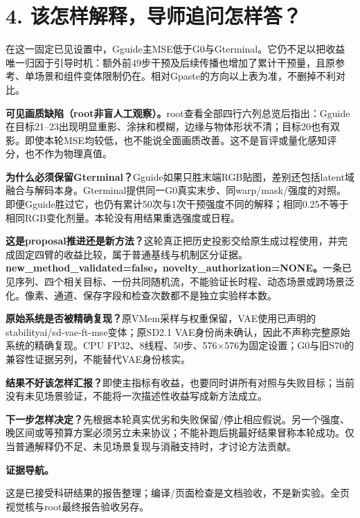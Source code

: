 \documentclass[UTF8,10pt,a4paper]{ctexart}
\begin{document}
\clearpage
\section*{4. 该怎样解释，导师追问怎样答？}
在这一固定已见设置中，Gguide主MSE低于G0与Gterminal。它仍不足以把收益唯一归因于引导时机：额外前49步干预及后续传播也增加了累计干预量，且原参考、单场景和组件变体限制仍在。相对Gpaste的方向以上表为准，不删掉不利对比。

\textbf{可见画质缺陷（root非盲人工观察）。}root查看全部四行六列总览后指出：Gguide在目标21--23出现明显重影、涂抹和模糊，边缘与物体形状不清；目标20也有双影。即使本轮MSE均较低，也不能说全面画质改善。这不是盲评或量化感知评分，也不作为物理真值。

\textbf{为什么必须保留Gterminal？}Gguide如果只胜末端RGB贴图，差别还包括latent域融合与解码本身。Gterminal提供同一G0真实末步、同warp/mask/强度的对照。即便Gguide胜过它，也仍有累计50次与1次干预强度不同的解释；相同0.25不等于相同RGB变化剂量。本轮没有用结果重选强度或日程。

\textbf{这是proposal推进还是新方法？}这轮真正把历史投影交给原生成过程使用，并完成固定四臂的收益比较，属于普通基线与机制区分证据。\textbf{new\_method\_validated=false，novelty\_authorization=NONE。}一条已见序列、四个相关目标、一份共同随机流，不能验证长时程、动态场景或跨场景泛化。像素、通道、保存字段和检查次数都不是独立实验样本数。

\textbf{原始系统是否被精确复现？}原VMem采样与权重保留，VAE使用已声明的stabilityai/sd-vae-ft-mse变体；原SD2.1 VAE身份尚未确认，因此不声称完整原始系统的精确复现。CPU FP32、8线程、50步、576×576为固定设置；G0与旧S70的兼容性证据另列，不能替代VAE身份核实。

\textbf{结果不好该怎样汇报？}即使主指标有收益，也要同时讲所有对照与失败目标；当前没有未见场景验证，不能将一次描述性收益写成新方法成立。

\textbf{下一步怎样决定？}先根据本轮真实优劣和失败保留/停止相应假说。另一个强度、晚区间或等预算方案必须另立未来协议；不能补跑后挑最好结果冒称本轮成功。仅当普通解释仍不足、未见场景复现与消融支持时，才讨论方法贡献。

\textbf{证据导航。}\noindent{}\par
\noindent{}\par
\noindent{}\par
\noindent{}\par
\noindent{}\par
\noindent{}\par
\noindent{}\par
\noindent{}\par
\noindent{}\par
\noindent{}\par

\vfill\noindent\small\textcolor{accent}{这是已接受科研结果的报告整理；编译/页面检查是文档验收，不是新实验。全页视觉核与root最终报告验收另存。}
\end{document}
